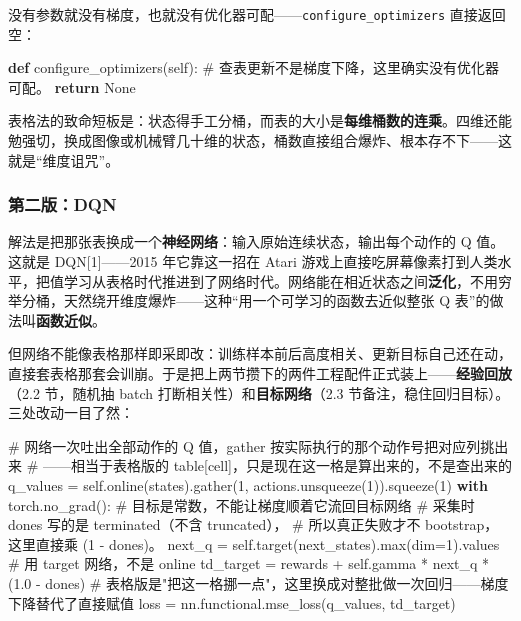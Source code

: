 \documentclass[
  chinese,
]{ctexart}
\newenvironment{Shaded}{\begin{snugshade}}{\end{snugshade}}
\newcommand{\BuiltInTok}[1]{\textcolor[rgb]{0.00,0.23,0.31}{#1}}
\newcommand{\CommentTok}[1]{\textcolor[rgb]{0.37,0.37,0.37}{#1}}
\newcommand{\ControlFlowTok}[1]{\textcolor[rgb]{0.00,0.23,0.31}{\textbf{#1}}}
\newcommand{\DecValTok}[1]{\textcolor[rgb]{0.68,0.00,0.00}{#1}}
\newcommand{\FloatTok}[1]{\textcolor[rgb]{0.68,0.00,0.00}{#1}}
\newcommand{\KeywordTok}[1]{\textcolor[rgb]{0.00,0.23,0.31}{\textbf{#1}}}
\newcommand{\NormalTok}[1]{\textcolor[rgb]{0.00,0.23,0.31}{#1}}
\newcommand{\OperatorTok}[1]{\textcolor[rgb]{0.37,0.37,0.37}{#1}}
\newcommand{\VariableTok}[1]{\textcolor[rgb]{0.07,0.07,0.07}{#1}}
\begin{document}
没有参数就没有梯度，也就没有优化器可配------\texttt{configure\_optimizers}
直接返回空：

\begin{Shaded}
\begin{Highlighting}[]
    \KeywordTok{def}\NormalTok{ configure\_optimizers(}\VariableTok{self}\NormalTok{):}
        \CommentTok{\# 查表更新不是梯度下降，这里确实没有优化器可配。}
        \ControlFlowTok{return} \VariableTok{None}
\end{Highlighting}
\end{Shaded}

表格法的致命短板是：状态得手工分桶，而表的大小是\textbf{每维桶数的连乘}。四维还能勉强切，换成图像或机械臂几十维的状态，桶数直接组合爆炸、根本存不下------这就是``维度诅咒''。

\subsubsection{第二版：DQN}\label{ux7b2cux4e8cux7248dqn}

解法是把那张表换成一个\textbf{神经网络}：输入原始连续状态，输出每个动作的
Q 值。这就是 DQN{[}1{]}------2015 年它靠这一招在 Atari
游戏上直接吃屏幕像素打到人类水平，把值学习从表格时代推进到了网络时代。网络能在相近状态之间\textbf{泛化}，不用穷举分桶，天然绕开维度爆炸------这种``用一个可学习的函数去近似整张
Q 表''的做法叫\textbf{函数近似}。

但网络不能像表格那样即采即改：训练样本前后高度相关、更新目标自己还在动，直接套表格那套会训崩。于是把上两节攒下的两件工程配件正式装上------\textbf{经验回放}（2.2
节，随机抽 batch 打断相关性）和\textbf{目标网络}（2.3
节备注，稳住回归目标）。三处改动一目了然：

\begin{Shaded}
\begin{Highlighting}[]
        \CommentTok{\# 网络一次吐出全部动作的 Q 值，gather 按实际执行的那个动作号把对应列挑出来}
        \CommentTok{\# ——相当于表格版的 table[cell]，只是现在这一格是算出来的，不是查出来的}
\NormalTok{        q\_values }\OperatorTok{=} \VariableTok{self}\NormalTok{.online(states).gather(}\DecValTok{1}\NormalTok{, actions.unsqueeze(}\DecValTok{1}\NormalTok{)).squeeze(}\DecValTok{1}\NormalTok{)}
        \ControlFlowTok{with}\NormalTok{ torch.no\_grad():        }\CommentTok{\# 目标是常数，不能让梯度顺着它流回目标网络}
            \CommentTok{\# 采集时 dones 写的是 terminated（不含 truncated），}
            \CommentTok{\# 所以真正失败才不 bootstrap，这里直接乘 (1 {-} dones)。}
\NormalTok{            next\_q }\OperatorTok{=} \VariableTok{self}\NormalTok{.target(next\_states).}\BuiltInTok{max}\NormalTok{(dim}\OperatorTok{=}\DecValTok{1}\NormalTok{).values    }\CommentTok{\# 用 target 网络，不是 online}
\NormalTok{            td\_target }\OperatorTok{=}\NormalTok{ rewards }\OperatorTok{+} \VariableTok{self}\NormalTok{.gamma }\OperatorTok{*}\NormalTok{ next\_q }\OperatorTok{*}\NormalTok{ (}\FloatTok{1.0} \OperatorTok{{-}}\NormalTok{ dones)}
        \CommentTok{\# 表格版是"把这一格挪一点"，这里换成对整批做一次回归——梯度下降替代了直接赋值}
\NormalTok{        loss }\OperatorTok{=}\NormalTok{ nn.functional.mse\_loss(q\_values, td\_target)}
\end{Highlighting}
\end{Shaded}
\end{document}
